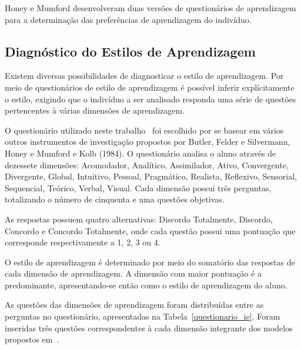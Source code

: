 Honey e Mumford desenvolveram duas versões de questionários de aprendizagem~\cite{honey2000} para a determinação das preferências de aprendizagem do indivíduo.

\subsection{Diagnóstico do Estilos de Aprendizagem}
Existem diversas possibilidades de diagnosticar o estilo de aprendizagem. Por meio de questionários de estilo de aprendizagem é possível inferir explícitamente o estilo, exigindo que o indivíduo a ser analisado responda uma série de questões pertencentes à várias dimensões de aprendizagem.

O questionário utilizado neste trabalho~\cite{muhlbeier12} foi escolhido por se basear em vários outros instrumentos de investigação propostos por Butler, Felder e Silvermann, Honey e Mumford e Kolb (1984). O questionário analisa o aluno através de dezessete dimensões: Acomodador, Analítico, Assimilador, Ativo, Convergente, Divergente, Global, Intuitivo, Pessoal, Pragmático, Realista, Reflexivo, Sensorial, Sequencial, Teórico, Verbal, Visual. Cada dimensão possui três perguntas, totalizando o número de cinquenta e uma questões objetivas.

As respostas possuem quatro alternativas: Discordo Totalmente, Discordo, Concordo e Concordo Totalmente, onde cada questão possui uma pontuação que corresponde respectivamente a 1, 2, 3 ou 4.

O estilo de aprendizagem é determinado por meio do somatório das respostas de cada dimensão de aprendizagem. A dimensão com maior pontuação é a predominante, apresentando-se então como o estilo de aprendizagem do aluno. 

As questões das dimensões de aprendizagem foram distribuídas entre as perguntas no questionário, apresentadas na Tabela~\ref{questionario_ie}. Foram inseridas três questões correspondentes à cada dimensão integrante dos modelos propostos em~\cite{muhlbeier12}.

